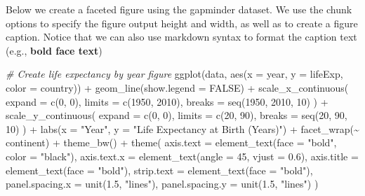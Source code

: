 \documentclass[
]{article}
\newenvironment{Shaded}{\begin{snugshade}}{\end{snugshade}}
\newcommand{\AttributeTok}[1]{\textcolor[rgb]{0.77,0.63,0.00}{#1}}
\newcommand{\CommentTok}[1]{\textcolor[rgb]{0.56,0.35,0.01}{\textit{#1}}}
\newcommand{\ConstantTok}[1]{\textcolor[rgb]{0.00,0.00,0.00}{#1}}
\newcommand{\DecValTok}[1]{\textcolor[rgb]{0.00,0.00,0.81}{#1}}
\newcommand{\FloatTok}[1]{\textcolor[rgb]{0.00,0.00,0.81}{#1}}
\newcommand{\FunctionTok}[1]{\textcolor[rgb]{0.00,0.00,0.00}{#1}}
\newcommand{\NormalTok}[1]{#1}
\newcommand{\SpecialCharTok}[1]{\textcolor[rgb]{0.00,0.00,0.00}{#1}}
\newcommand{\StringTok}[1]{\textcolor[rgb]{0.31,0.60,0.02}{#1}}
\begin{document}
Below we create a faceted figure using the gapminder dataset. We use the
chunk options to specify the figure output height and width, as well as
to create a figure caption. Notice that we can also use markdown syntax
to format the caption text (e.g., \textbf{bold face text})

\begin{Shaded}
\begin{Highlighting}[]
\CommentTok{\# Create life expectancy by year figure}
\FunctionTok{ggplot}\NormalTok{(data, }\FunctionTok{aes}\NormalTok{(}\AttributeTok{x =}\NormalTok{ year, }\AttributeTok{y =}\NormalTok{ lifeExp, }\AttributeTok{color =}\NormalTok{ country)) }\SpecialCharTok{+}
  \FunctionTok{geom\_line}\NormalTok{(}\AttributeTok{show.legend =} \ConstantTok{FALSE}\NormalTok{) }\SpecialCharTok{+}
  \FunctionTok{scale\_x\_continuous}\NormalTok{(}
    \AttributeTok{expand =} \FunctionTok{c}\NormalTok{(}\DecValTok{0}\NormalTok{, }\DecValTok{0}\NormalTok{),}
    \AttributeTok{limits =} \FunctionTok{c}\NormalTok{(}\DecValTok{1950}\NormalTok{, }\DecValTok{2010}\NormalTok{),}
    \AttributeTok{breaks =} \FunctionTok{seq}\NormalTok{(}\DecValTok{1950}\NormalTok{, }\DecValTok{2010}\NormalTok{, }\DecValTok{10}\NormalTok{)}
\NormalTok{  ) }\SpecialCharTok{+}
  \FunctionTok{scale\_y\_continuous}\NormalTok{(}
    \AttributeTok{expand =} \FunctionTok{c}\NormalTok{(}\DecValTok{0}\NormalTok{, }\DecValTok{0}\NormalTok{),}
    \AttributeTok{limits =} \FunctionTok{c}\NormalTok{(}\DecValTok{20}\NormalTok{, }\DecValTok{90}\NormalTok{),}
    \AttributeTok{breaks =} \FunctionTok{seq}\NormalTok{(}\DecValTok{20}\NormalTok{, }\DecValTok{90}\NormalTok{, }\DecValTok{10}\NormalTok{)}
\NormalTok{  ) }\SpecialCharTok{+}
  \FunctionTok{labs}\NormalTok{(}\AttributeTok{x =} \StringTok{"Year"}\NormalTok{, }\AttributeTok{y =} \StringTok{"Life Expectancy at Birth (Years)"}\NormalTok{) }\SpecialCharTok{+}
  \FunctionTok{facet\_wrap}\NormalTok{(}\SpecialCharTok{\textasciitilde{}}\NormalTok{ continent) }\SpecialCharTok{+}
  \FunctionTok{theme\_bw}\NormalTok{() }\SpecialCharTok{+}
  \FunctionTok{theme}\NormalTok{(}
    \AttributeTok{axis.text =} \FunctionTok{element\_text}\NormalTok{(}\AttributeTok{face =} \StringTok{"bold"}\NormalTok{, }\AttributeTok{color =} \StringTok{"black"}\NormalTok{),}
    \AttributeTok{axis.text.x =} \FunctionTok{element\_text}\NormalTok{(}\AttributeTok{angle =} \DecValTok{45}\NormalTok{, }\AttributeTok{vjust =} \FloatTok{0.6}\NormalTok{),}
    \AttributeTok{axis.title =} \FunctionTok{element\_text}\NormalTok{(}\AttributeTok{face =} \StringTok{"bold"}\NormalTok{),}
    \AttributeTok{strip.text =} \FunctionTok{element\_text}\NormalTok{(}\AttributeTok{face =} \StringTok{"bold"}\NormalTok{),}
    \AttributeTok{panel.spacing.x =} \FunctionTok{unit}\NormalTok{(}\FloatTok{1.5}\NormalTok{, }\StringTok{"lines"}\NormalTok{),}
    \AttributeTok{panel.spacing.y =} \FunctionTok{unit}\NormalTok{(}\FloatTok{1.5}\NormalTok{, }\StringTok{"lines"}\NormalTok{)}
\NormalTok{  )}
\end{Highlighting}
\end{Shaded}
\end{document}
